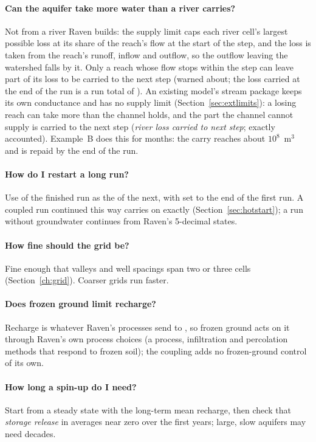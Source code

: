 \paragraph{Can the aquifer take more water than a river carries?} Not from a river Raven builds: the supply limit caps
each river cell's largest possible loss at its share of the reach's flow at the start of the step, and the loss is taken
from the reach's runoff, inflow and outflow, so the outflow leaving the watershed falls by it. Only a reach whose flow stops within the step
can leave part of its loss to be carried to the next step (warned about; the loss carried at the end of the run is a run
total of ). An existing model's stream package keeps its own
conductance and has no supply limit (Section~\ref{sec:extlimits}): a losing reach can take more than the channel holds, and
the part the channel cannot supply is carried to the next step (\emph{river loss carried to next step}; exactly accounted).
Example~B does this for months: the carry reaches about $10^{8}$~m$^3$ and is repaid by the end of the run.
\paragraph{How do I restart a long run?} Use  of the finished run as the  of the next, with
 set to the end of the first run. A coupled run continued this way carries on exactly
(Section~\ref{sec:hotstart}); a run without groundwater continues from Raven's 5-decimal states.
\paragraph{How fine should the grid be?} Fine enough that valleys and well spacings span two or three cells
(Section~\ref{ch:grid}). Coarser grids run faster.
\paragraph{Does frozen ground limit recharge?} Recharge is whatever Raven's processes send to , so frozen
ground acts on it through Raven's own process choices (a  process, infiltration and percolation methods
that respond to frozen soil); the coupling adds no frozen-ground control of its own.
\paragraph{How long a spin-up do I need?} Start from a steady state with the long-term mean recharge, then check that
\emph{storage release} in  averages near zero over the first years; large, slow aquifers may need decades.
